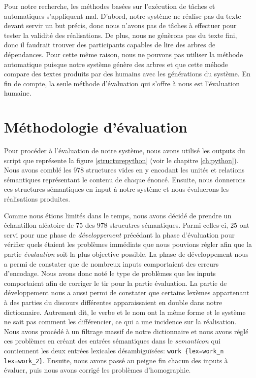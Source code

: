 Pour notre recherche, les méthodes basées sur l'exécution de tâches et automatiques s'appliquent mal. D'abord, notre système ne réalise pas du texte devant servir un but précis, donc nous n'avons pas de tâches à effectuer pour tester la validité des réalisations. De plus, nous ne génèrons pas du texte fini, donc il faudrait trouver des participants capables de lire des arbres de dépendances. Pour cette même raison, nous ne pouvons pas utiliser la méthode automatique puisque notre système génère des arbres et que cette méhode compare des textes produits par des humains avec les générations du système. En fin de compte, la seule méthode d'évaluation qui s'offre à nous est l'évaluation humaine.

\section{Méthodologie d'évaluation}

Pour procéder à l'évaluation de notre système, nous avons utilisé les outputs du script que représente la figure \ref{structurepython} (voir le chapitre \ref{ch:python}).  Nous avons comblé les 978 structures vides en y encodant les unités et relations sémantiques représentant le contenu de chaque énoncé. Ensuite, nous donnerons ces structures sémantiques en input à notre système et nous évaluerons les réalisations produites.

Comme nous étions limités dans le temps, nous avons décidé de prendre un échantillon aléatoire de 75 des 978 strucutres sémantiques. Parmi celles-ci, 25 ont servi pour une phase de \emph{développement} précédant la phase d'évaluation pour vérifier quels étaient les problèmes immédiats que nous pouvions régler afin que la partie \emph{évaluation} soit la plus objective possible. La phase de développement nous a permi de constater que de nombreux inputs comportaient des erreurs d'encodage. Nous avons donc noté le type de problèmes que les inputs comportaient afin de corriger le tir pour la partie évaluation. La partie de développement nous a aussi permi de constater que certains lexèmes appartenant à des parties du discours différentes apparaissaient en double dans notre dictionnaire. Autrement dit, le verbe  et le nom  ont la même forme et le système ne sait pas comment les différencier, ce qui a une incidence sur la réalisation. Nous avons procédé à un filtrage massif de notre dictionnaire et nous avons réglé ces problèmes en créant des entrées sémantiques dans le \emph{semanticon} qui contiennent les deux entrées lexicales désambiguïsées: \lstinline!work {lex=work_n  lex=work_2}!. Ensuite, nous avons passé au peigne fin chacun des inputs à évaluer, puis nous avons corrigé les problèmes d'homographie.

